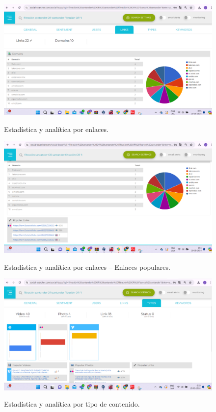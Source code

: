 \documentclass[stu, 11pt, letterpaper, donotrepeattitle, floatsintext, natbib]{apa7}
\begin{document}
\begin{figure}[H]
\centering
\caption{Estadística y analítica por enlaces.}
\includegraphics[width=0.75\linewidth]{osi24.png} %
\label{fig:OverallEffect}
\end{figure}

\begin{figure}[H]
\centering
\caption{Estadística y analítica por enlaces – Enlaces populares.}
\includegraphics[width=0.75\linewidth]{osi25.png} %
\label{fig:OverallEffect}
\end{figure}

\begin{figure}[H]
\centering
\caption{Estadística y analítica por tipo de contenido.}
\includegraphics[width=0.75\linewidth]{osi26.png} %
\label{fig:OverallEffect}
\end{figure}
\end{document}
